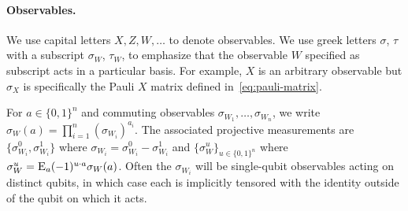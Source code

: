 \paragraph{Observables.}
We use capital letters $X,Z,W,\ldots$ to denote observables. We use greek letters $\sigma$, $\tau$ with a subscript $\sigma_W$, $\tau_W$, to emphasize that the observable $W$ specified as subscript acts in a particular basis. For example, $X$ is an arbitrary observable but $\sigma_X$ is specifically the Pauli $X$ matrix defined in~\eqref{eq:pauli-matrix}.

For $a\in\{0,1\}^n$ and commuting observables $\sigma_{W_1},\ldots,\sigma_{W_n}$, we write $\sigma_W(a) = \prod_{i=1}^n (\sigma_{W_i})^{a_i}$. The associated projective measurements are $\{\sigma_{W_i}^0,\sigma_{W_i}^1\}$ where $\sigma_{W_i} = \sigma_{W_i}^0 - \sigma_{W_i}^1$ and $\{\sigma_W^u\}_{u\in\{0,1\}^n}$ where $\sigma_W^u = \mathop{\textsc{E}}_{a} (-1)^{u\cdot a} \sigma_W(a)$.  Often the $\sigma_{W_i}$ will be single-qubit observables acting on distinct qubits, in which case each is implicitly tensored with the identity outside of the qubit on which it acts. 


